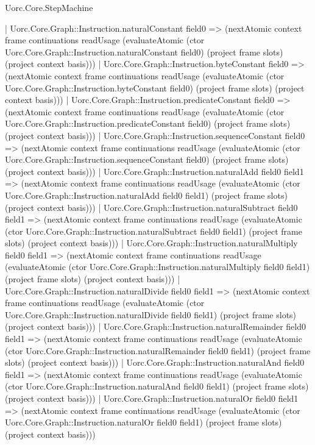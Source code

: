 \begin{lexlean}{Uorc.Core.StepMachine}
\begin{semanticmodule}
{      | Uorc.Core.Graph::Instruction.naturalConstant field0 => (nextAtomic context frame continuations readUsage (evaluateAtomic (ctor Uorc.Core.Graph::Instruction.naturalConstant field0) (project frame slots) (project context basis)))
      | Uorc.Core.Graph::Instruction.byteConstant field0 => (nextAtomic context frame continuations readUsage (evaluateAtomic (ctor Uorc.Core.Graph::Instruction.byteConstant field0) (project frame slots) (project context basis)))
      | Uorc.Core.Graph::Instruction.predicateConstant field0 => (nextAtomic context frame continuations readUsage (evaluateAtomic (ctor Uorc.Core.Graph::Instruction.predicateConstant field0) (project frame slots) (project context basis)))
      | Uorc.Core.Graph::Instruction.sequenceConstant field0 => (nextAtomic context frame continuations readUsage (evaluateAtomic (ctor Uorc.Core.Graph::Instruction.sequenceConstant field0) (project frame slots) (project context basis)))
      | Uorc.Core.Graph::Instruction.naturalAdd field0 field1 => (nextAtomic context frame continuations readUsage (evaluateAtomic (ctor Uorc.Core.Graph::Instruction.naturalAdd field0 field1) (project frame slots) (project context basis)))
      | Uorc.Core.Graph::Instruction.naturalSubtract field0 field1 => (nextAtomic context frame continuations readUsage (evaluateAtomic (ctor Uorc.Core.Graph::Instruction.naturalSubtract field0 field1) (project frame slots) (project context basis)))
      | Uorc.Core.Graph::Instruction.naturalMultiply field0 field1 => (nextAtomic context frame continuations readUsage (evaluateAtomic (ctor Uorc.Core.Graph::Instruction.naturalMultiply field0 field1) (project frame slots) (project context basis)))
      | Uorc.Core.Graph::Instruction.naturalDivide field0 field1 => (nextAtomic context frame continuations readUsage (evaluateAtomic (ctor Uorc.Core.Graph::Instruction.naturalDivide field0 field1) (project frame slots) (project context basis)))
      | Uorc.Core.Graph::Instruction.naturalRemainder field0 field1 => (nextAtomic context frame continuations readUsage (evaluateAtomic (ctor Uorc.Core.Graph::Instruction.naturalRemainder field0 field1) (project frame slots) (project context basis)))
      | Uorc.Core.Graph::Instruction.naturalAnd field0 field1 => (nextAtomic context frame continuations readUsage (evaluateAtomic (ctor Uorc.Core.Graph::Instruction.naturalAnd field0 field1) (project frame slots) (project context basis)))
      | Uorc.Core.Graph::Instruction.naturalOr field0 field1 => (nextAtomic context frame continuations readUsage (evaluateAtomic (ctor Uorc.Core.Graph::Instruction.naturalOr field0 field1) (project frame slots) (project context basis)))
}
\end{semanticmodule}
\end{lexlean}
